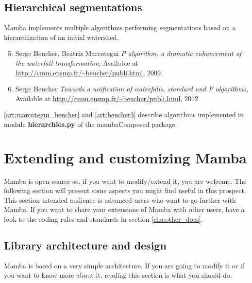 \documentclass[a4paper,10pt,oneside]{article}
\begin{document}
\subsection{Hierarchical segmentations}
\label{cha:hierar_seg}

Mamba implements multiple algorithms performing segmentations based on
a hierarchization of an initial watershed.

\begin{enumerate}
\setcounter{enumi}{4}
\item \label{art:marcotegui_beucher} Serge Beucher, Beatriz Marcotegui
\emph{P algorithm, a dramatic enhancement of the waterfall transformation},
Available at \url{http://cmm.ensmp.fr/~beucher/publi.html}, 2009

\item \label{art:beucher3} Serge Beucher
\emph{Towards a unification of waterfalls, standard and P algorithms},
Available at \url{http://cmm.ensmp.fr/~beucher/publi.html}, 2012
\end{enumerate}

\ref{art:marcotegui_beucher} and \ref{art:beucher3} describe algorithms
implemented in module \textbf{hierarchies.py} of the mambaComposed package.

\pagebreak

\section{Extending and customizing Mamba}

Mamba is open-source so, if you want to modify/extend it, you are welcome. The
following section will present some aspects you might find useful in this
prospect. This section intended audience is advanced users who want to go 
further with Mamba. If you want to share your extensions of Mamba with other users,
have a look to the coding rules and standards in section \ref{cha:other_docs}. 

\subsection{Library architecture and design}
\label{cha:lib_arch}

Mamba is based on a very simple architecture. If you are going to modify it or
if you want to know more about it, reading this section is what you should do.
\end{document}
